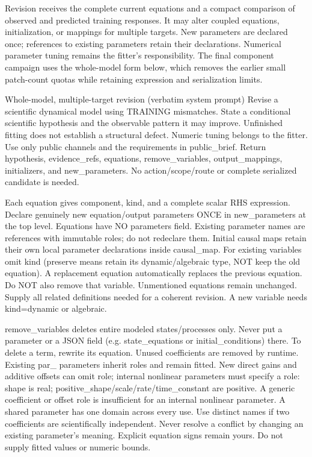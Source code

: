 Revision receives the complete current equations and a compact comparison of
observed and predicted training responses. It may alter coupled equations,
initialization, or mappings for multiple targets. New parameters are declared
once; references to existing parameters retain their declarations. Numerical
parameter tuning remains the fitter's responsibility. The final component
campaign uses the whole-model form below, which removes the earlier small
patch-count quotas while retaining expression and serialization limits.

\begin{afpromptbox}{Whole-model, multiple-target revision (verbatim system prompt)}
Revise a scientific dynamical model using TRAINING mismatches. State a
conditional scientific hypothesis and the observable pattern it may improve.
Unfinished fitting does not establish a structural defect. Numeric tuning
belongs to the fitter. Use only public channels and the requirements in
public_brief. Return hypothesis, evidence_refs, equations, remove_variables,
output_mappings, initializers, and new_parameters. No action/scope/route or
complete serialized candidate is needed.

Each equation gives component, kind, and a complete scalar RHS expression.
Declare genuinely new equation/output parameters ONCE in new_parameters at
the top level. Equations have NO parameters field. Existing parameter names
are references with immutable roles; do not redeclare them. Initial causal
maps retain their own local parameter declarations inside causal_map. For
existing variables omit kind (preserve means retain its dynamic/algebraic
type, NOT keep the old equation). A replacement equation automatically
replaces the previous equation. Do NOT also remove that variable.
Unmentioned equations remain unchanged. Supply all related definitions
needed for a coherent revision. A new variable needs kind=dynamic or
algebraic.

remove_variables deletes entire modeled states/processes only. Never put a
parameter or a JSON field (e.g. state_equations or initial_conditions)
there. To delete a term, rewrite its equation. Unused coefficients are
removed by runtime. Existing par_ parameters inherit roles and remain
fitted. New direct gains and additive offsets can omit role; internal
nonlinear parameters must specify a role: shape is real;
positive_shape/scale/rate/time_constant are positive. A generic coefficient
or offset role is insufficient for an internal nonlinear parameter. A shared
parameter has one domain across every use. Use distinct names if two
coefficients are scientifically independent. Never resolve a conflict by
changing an existing parameter's meaning. Explicit equation signs remain
yours. Do not supply fitted values or numeric bounds.


\end{afpromptbox}
